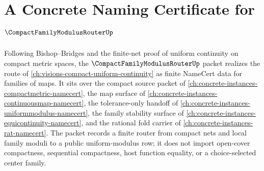 \chapter{A Concrete Naming Certificate for $\CompactFamilyModulusRouterUp$}
\label{ch:concrete-instances-compact-family-modulus-router-namecert}

Following Bishop--Bridges and the finite-net proof of uniform continuity on compact metric spaces, the $\CompactFamilyModulusRouterUp$ packet realizes the route of \autoref{ch:visions-compact-uniform-continuity} as finite NameCert data for families of maps. It sits over the compact source packet of \autoref{ch:concrete-instances-compactmetric-namecert}, the map surface of \autoref{ch:concrete-instances-continuousmap-namecert}, the tolerance-only handoff of \autoref{ch:concrete-instances-uniformmodulus-namecert}, the family stability surface of \autoref{ch:concrete-instances-equicontinuity-namecert}, and the rational fold carrier of \autoref{ch:concrete-instances-rat-namecert}. The packet records a finite router from compact nets and local family moduli to a public uniform-modulus row; it does not import open-cover compactness, sequential compactness, host function equality, or a choice-selected center family.

